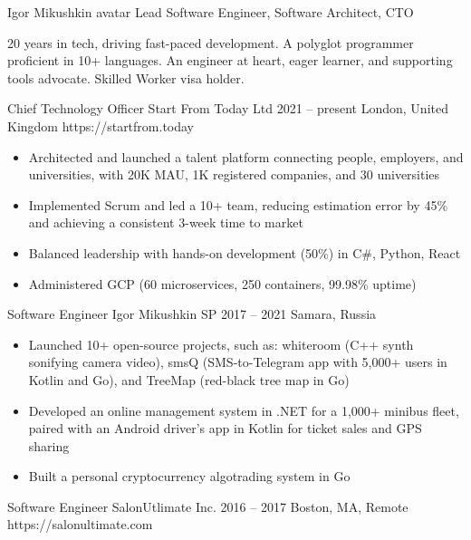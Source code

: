 \documentclass[9pt,a4paper]{juicv}
\begin{document}
\begin{paracol}{2}
\cvHeader
    {Igor Mikushkin}
    {avatar}
    {Lead Software Engineer, Software Architect, CTO}

20 years in tech, driving fast-paced development.
A polyglot programmer proficient in 10+ languages.
An engineer at heart, eager learner, and supporting tools advocate.
Skilled Worker visa holder.

    \cvLeftEvent
        {Chief Technology Officer}
        {Start From Today Ltd}
        {2021 -- present}
        {London, United Kingdom}
        {https://startfrom.today}

        \begin{itemize}
            \item Architected and launched a talent platform connecting people, employers, and universities,
                  with 20K MAU, 1K registered companies, and 30 universities
            \item Implemented Scrum and led a 10+ team,
                  reducing estimation error by 45\%
                  and achieving a consistent 3-week time to market
            \item Balanced leadership with hands-on development (50\%)
                  in C\#, Python, React
            \item Administered GCP (60 microservices, 250 containers, 99.98\% uptime)
        \end{itemize}

    \cvLeftEvent
        {Software Engineer}
        {Igor Mikushkin SP}
        {2017 -- 2021}
        {Samara, Russia}
        {}

        \begin{itemize}
            \item Launched 10+ open-source projects, such as:
                  whiteroom (C++ synth sonifying camera video),
                  smsQ (SMS-to-Telegram app with 5,000+ users in Kotlin and Go),
                  and TreeMap (red-black tree map in Go)
            \item Developed an online management system in .NET for a 1,000+ minibus fleet,
                  paired with an Android driver’s app in Kotlin for ticket sales and GPS sharing
            \item Built a personal cryptocurrency algotrading system in Go
        \end{itemize}

    \cvLeftEvent
        {Software Engineer}
        {SalonUtlimate Inc.}
        {2016 -- 2017}
        {Boston, MA, Remote}
        {https://salonultimate.com}


\end{paracol}
\end{document}
